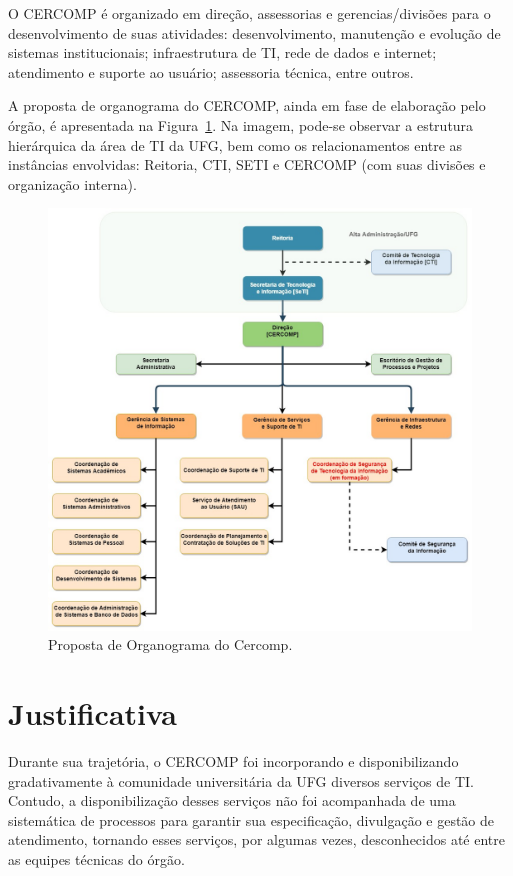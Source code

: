O CERCOMP é organizado em direção, assessorias e gerencias/divisões para o desenvolvimento de suas atividades: desenvolvimento, manutenção e evolução de sistemas institucionais; infraestrutura de TI, rede de dados e internet; atendimento e suporte ao usuário; assessoria técnica, entre outros.

A proposta de organograma do CERCOMP, ainda em fase de elaboração pelo órgão, é apresentada na Figura~\ref{fig:organograma-cercomp}. Na imagem, pode-se observar a estrutura hierárquica da área de TI da UFG, bem como os relacionamentos entre as instâncias envolvidas: Reitoria, CTI, SETI e CERCOMP (com suas divisões e organização interna).

\begin{figure}[!hb]
  \centering
  \includegraphics[width=1\textwidth]{./fig/organograma-cercomp-completo.jpg}
  \caption[Proposta de Organograma do CERCOMP.]{Proposta de Organograma do Cercomp.}
   \label{fig:organograma-cercomp}
\end{figure}

\section{Justificativa}
\label{sec:justificativa}

Durante sua trajetória, o CERCOMP foi incorporando e disponibilizando gradativamente à comunidade universitária da UFG diversos serviços de TI. Contudo, a disponibilização desses serviços não foi acompanhada de uma sistemática de processos para garantir sua especificação, divulgação e gestão de atendimento, tornando esses serviços, por algumas vezes, desconhecidos até entre as equipes técnicas do órgão.

